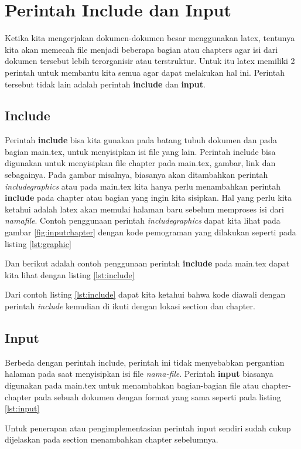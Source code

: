 \section{Perintah Include dan Input}
Ketika kita mengerjakan dokumen-dokumen besar menggunakan latex, tentunya kita akan memecah file menjadi beberapa bagian atau chapters agar isi dari dokumen tersebut lebih terorganisir atau terstruktur. Untuk itu latex memiliki 2 perintah untuk membantu kita semua agar dapat melakukan hal ini. Perintah tersebut tidak lain adalah perintah \textbf{include} dan \textbf{input}.
\subsection{Include} 
Perintah \textbf{include} bisa kita gunakan pada batang tubuh dokumen dan pada bagian main.tex, untuk menyisipkan isi file yang lain. Perintah include bisa digunakan untuk menyisipkan file chapter pada main.tex, gambar, link dan sebagainya. Pada gambar misalnya, biasanya akan ditambahkan perintah \textit{includegraphics} atau pada main.tex kita hanya perlu menambahkan perintah \textbf{include} pada chapter atau bagian yang ingin kita sisipkan. Hal yang perlu kita ketahui adalah latex akan memulai halaman baru sebelum memproses isi dari \textit{namafile}. Contoh penggunaan perintah \textit{includegraphics} dapat kita lihat pada gambar \ref{fig:inputchapter} dengan kode pemograman yang dilakukan seperti pada listing \ref{lst:graphic}



Dan berikut adalah contoh penggunaan perintah \textbf{include} pada main.tex dapat kita lihat dengan listing \ref{lst:include}



Dari contoh listing \ref{lst:include} dapat kita ketahui bahwa kode diawali dengan perintah \textit{include} kemudian di ikuti dengan lokasi section dan chapter.
\subsection{Input}
Berbeda dengan perintah include, perintah ini tidak menyebabkan pergantian halaman pada saat menyisipkan isi file \textit{nama-file}. Perintah \textbf{input} biasanya digunakan pada main.tex untuk menambahkan bagian-bagian file atau chapter-chapter pada sebuah dokumen dengan format yang sama seperti pada listing \ref{lst:input} 



Untuk penerapan atau pengimplementasian perintah input sendiri sudah cukup dijelaskan pada section menambahkan chapter sebelumnya. 
